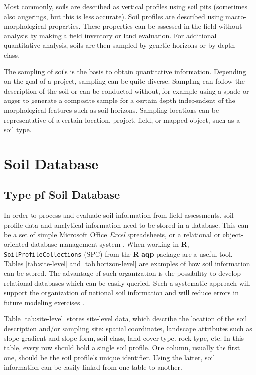 \documentclass[10pt,b5paper,]{book}
\theoremstyle{definition}
\theoremstyle{definition}
\theoremstyle{definition}
\theoremstyle{remark}
\begin{document}
Most commonly, soils are described as vertical profiles using soil pits
(sometimes also augerings, but this is less accurate). Soil profiles are
described using macro-morphological properties. These properties can be
assessed in the field without analysis by making a field inventory or
land evaluation. For additional quantitative analysis, soils are then
sampled by genetic horizons or by depth class.

The sampling of soils is the basis to obtain quantitative information.
Depending on the goal of a project, sampling can be quite diverse.
Sampling can follow the description of the soil or can be conducted
without, for example using a spade or auger to generate a composite
sample for a certain depth independent of the morphological features
such as soil horizons. Sampling locations can be representative of a
certain location, project, field, or mapped object, such as a soil type.

\hypertarget{soil-database}{%
\section{Soil Database}\label{soil-database}}

\hypertarget{type-pf-soil-database}{%
\subsection{Type pf Soil Database}\label{type-pf-soil-database}}

In order to process and evaluate soil information from field
assessments, soil profile data and analytical information need to be
stored in a database. This can be a set of simple Microsoft Office
\emph{Excel} spreadsheets, or a relational or object-oriented database
management system \citep{baritz2008environmental}. When working in
\textbf{R}, \texttt{SoilProfileCollections} (SPC) from the \textbf{R}
\textbf{aqp} package are a useful tool. Tables \ref{tab:site-level} and
\ref{tab:horizon-level} are examples of how soil information can be
stored. The advantage of such organization is the possibility to develop
relational databases which can be easily queried. Such a systematic
approach will support the organization of national soil information and
will reduce errors in future modeling exercises
\citep{baritz2008environmental}.

Table \ref{tab:site-level} stores site-level data, which describe the
location of the soil description and/or sampling site: spatial
coordinates, landscape attributes such as slope gradient and slope form,
soil class, land cover type, rock type, etc. In this table, every row
should hold a single soil profile. One column, usually the first one,
should be the soil profile's unique identifier. Using the latter, soil
information can be easily linked from one table to another.
\end{document}
